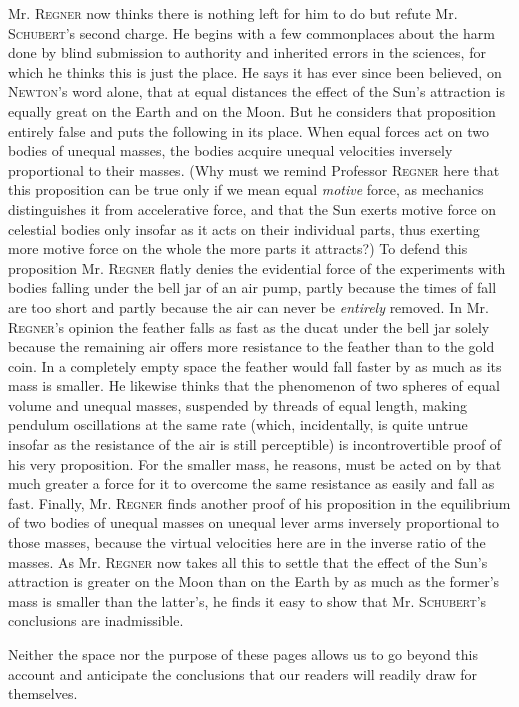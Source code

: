 Mr. \textsc{Regner} now thinks there is nothing left for him to do but refute Mr. \textsc{Schubert}'s second charge. He begins with a few commonplaces about the harm done by blind submission to authority and inherited errors in the sciences, for which he thinks this is just the place. He says it has ever since been believed, on \textsc{Newton}'s word alone, that at equal distances the effect of the Sun's attraction is equally great on the Earth and on the Moon. But he considers that proposition entirely false and puts the following in its place. When equal forces act on two bodies of unequal masses, the bodies acquire unequal velocities inversely proportional to their masses. (Why must we remind Professor \textsc{Regner} here that this proposition can be true only if we mean equal \emph{motive} force, as mechanics distinguishes it from accelerative force, and that the Sun exerts motive force on celestial bodies only insofar as it acts on their individual parts, thus exerting more motive force on the whole the more parts it attracts?) To defend this proposition Mr. \textsc{Regner} flatly denies the evidential force of the experiments with bodies falling under the bell jar of an air pump, partly because the times of fall are too short and partly because the air can never be \emph{entirely} removed. In Mr. \textsc{Regner}'s opinion the feather falls as fast as the ducat under the bell jar solely because the remaining air offers more resistance to the feather than to the gold coin. In a completely empty space the feather would fall faster by as much as its mass is smaller. He likewise thinks that the phenomenon of two spheres of equal volume and unequal masses, suspended by threads of equal length, making pendulum oscillations at the same rate (which, incidentally, is quite untrue insofar as the resistance of the air is still perceptible) is incontrovertible proof of his very proposition. For the smaller mass, he reasons, must be acted on by that much greater a force for it to overcome the same resistance as easily and fall as fast. Finally, Mr. \textsc{Regner} finds another proof of his proposition in the equilibrium of two bodies of unequal masses on unequal lever arms inversely proportional to those masses, because the virtual velocities here are in the inverse ratio of the masses. As Mr. \textsc{Regner} now takes all this to settle that the effect of the Sun's attraction is greater on the Moon than on the Earth by as much as the former's mass is smaller than the latter's, he finds it easy to show that Mr. \textsc{Schubert}'s conclusions are inadmissible.

Neither the space nor the purpose of these pages allows us to go beyond this account and anticipate the conclusions that our readers will readily draw for themselves.
